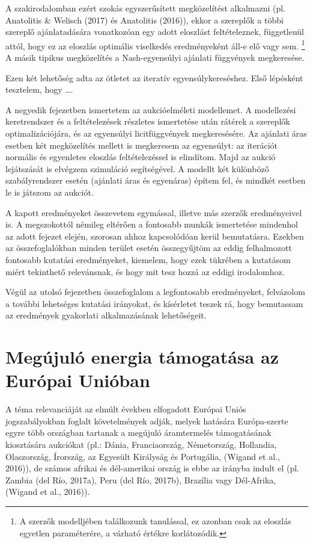 \documentclass[twoside, magyar, showtrims]{corvinusphd}
\begin{document}
A szakirodalomban ezért szokás egyszerűsített megközelítést alkalmazni
(pl. Anatolitis \& Welisch (2017) és Anatolitis (2016)), ekkor
a szereplők a többi szereplő ajánlatadására vonatkozóan egy adott eloszlást feltételeznek,
függetlenül attól, hogy ez az eloszlás optimális viselkedés eredményeként áll-e elő vagy sem.
\footnote{A szerzők modelljében találkozunk tanulással, ez azonban csak az eloszlás
egyetlen paraméterére, a várható értékre korlátozódik.}
A másik tipikus megközelítés a Nash-egyensúlyi ajánlati függvények megkeresése.

Ezen két lehetőség adta az ötletet az iteratív egyensúlykereséshez.
Első lépésként tesztelem, hogy \ldots .

A negyedik fejezetben ismertetem az aukcióelméleti modellemet.
A modellezési keretrendszer és a feltételezések részletes ismertetése után rátérek
a szereplők optimalizációjára, és az egyensúlyi licitfüggvények megkeresésére.
Az ajánlati áras esetben két megközelítés mellett is megkeresem
az egyensúlyt: az iterációt normális és egyenletes eloszlás
feltételezéssel is elindítom.
Majd az aukció lejátszását is elvégzem szimuláció segítségével.
A modellt két különböző szabályrendszer esetén (ajánlati áras és egyenáras) építem fel,
és mindkét esetben le is játszom az aukciót. 

A kapott eredményeket összevetem egymással,
illetve más szerzők eredményeivel is.
A megszokottól némileg eltérően
a fontosabb munkák ismertetése
mindenhol az adott fejezet elején,
szorosan ahhoz kapcsolódóan kerül bemutatásra.
Ezekben az összefoglalókban minden
terület esetén összegyűjtöm az
eddig felhalmozott fontosabb kutatási eredményeket,
kiemelem, hogy ezek tükrében a kutatásom
miért tekinthető relevánsnak, és hogy mit tesz hozzá az eddigi irodalomhoz. 

Végül az utolsó fejezetben összefoglalom a legfontosabb eredményeket,
felvázolom a további lehetséges kutatási irányokat, és kísérletet teszek rá,
hogy bemutassam az eredmények gyakorlati alkalmazásának lehetőségeit.

\chapter{Megújuló energia támogatása az Európai Unióban}

\scwords A téma relevanciáját az elmúlt években elfogadott Európai Uniós jogszabályokban
foglalt követelmények adják, melyek hatására Európa-szerte egyre több országban
tartanak a megújuló áramtermelés támogatásának kiosztására
aukciókat (pl.: Dánia, Franciaország, Németország,
Hollandia, Olaszország, Írország, az Egyesült Királyság és Portugália,
(Wigand et al., 2016)), de számos afrikai és dél-amerikai ország
is ebbe az irányba indult el (pl. Zambia (del Río, 2017a),
Peru (del Río, 2017b), Brazília vagy Dél-Afrika, (Wigand et al., 2016)). 
\end{document}
